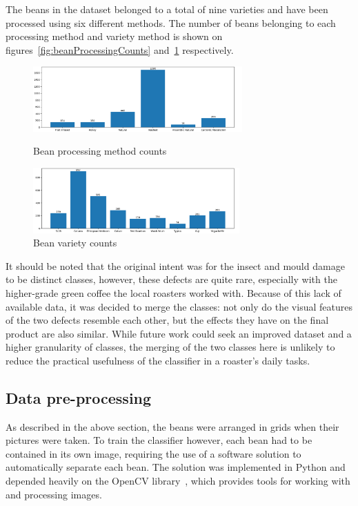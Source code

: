 The beans in the dataset belonged to a total of nine varieties and have been processed using six different methods.
The number of beans belonging to each processing method and variety method is shown
on figures~\ref{fig:beanProcessingCounts} and~\ref{fig:beanVarietyCounts} respectively.
\begin{figure}[h]
	\centering
		\includegraphics[width=\linewidth, height=2.5cm, keepaspectratio]{
			./figures/methodology/processing-counts
		}
	\caption{Bean processing method counts}
	\label{fig:beanProcessingCounts}

	\includegraphics[width=\linewidth, height=2.5cm, keepaspectratio]{
			./figures/methodology/variety-counts
		}
	\caption{Bean variety counts}
	\label{fig:beanVarietyCounts}
\end{figure}

It should be noted that the original intent was for the insect and mould damage to be distinct classes,
however, these defects are quite rare, especially with the higher-grade green coffee the local roasters worked with.
Because of this lack of available data, it was decided to merge the classes: not only do the visual features of the two
defects resemble each other, but the effects they have on the final product are also similar.
While future work could seek an improved dataset and a higher granularity of classes, the merging of the two classes here
is unlikely to reduce the practical usefulness of the classifier in a roaster's daily tasks.
\subsection{Data pre-processing}
\label{subsec:data-pre-processing}
As described in the above section, the beans were arranged in grids when their pictures were taken.
To train the classifier however, each bean had to be contained in its own image, requiring the use of a software solution
to automatically separate each bean.
The solution was implemented in Python and depended heavily on the OpenCV library~\cite{opencvLibrary}, which provides
tools for working with and processing images.

